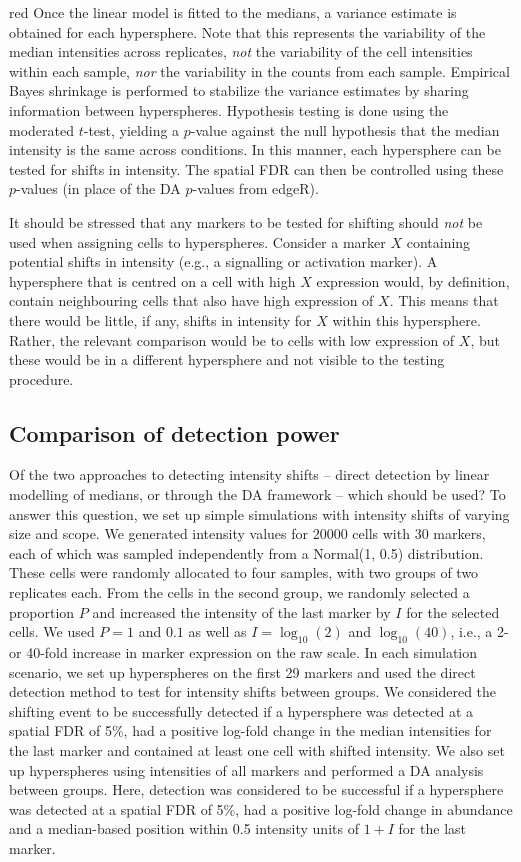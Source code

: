 \documentclass{article}
\begin{document}
\begin{color}{red}
Once the linear model is fitted to the medians, a variance estimate is obtained for each hypersphere.
Note that this represents the variability of the median intensities across replicates, \textit{not} the variability of the cell intensities within each sample, \textit{nor} the variability in the counts from each sample.
Empirical Bayes shrinkage is performed to stabilize the variance estimates by sharing information between hyperspheres.
Hypothesis testing is done using the moderated $t$-test, yielding a $p$-value against the null hypothesis that the median intensity is the same across conditions. 
In this manner, each hypersphere can be tested for shifts in intensity.
The spatial FDR can then be controlled using these $p$-values (in place of the DA $p$-values from edgeR). 

It should be stressed that any markers to be tested for shifting should \textit{not} be used when assigning cells to hyperspheres.
Consider a marker $X$ containing potential shifts in intensity (e.g., a signalling or activation marker).
A hypersphere that is centred on a cell with high $X$ expression would, by definition, contain neighbouring cells that also have high expression of $X$.
This means that there would be little, if any, shifts in intensity for $X$ within this hypersphere.
Rather, the relevant comparison would be to cells with low expression of $X$, but these would be in a different hypersphere and not visible to the testing procedure.

\subsection{Comparison of detection power}
Of the two approaches to detecting intensity shifts -- direct detection by linear modelling of medians, or through the DA framework -- which should be used?
To answer this question, we set up simple simulations with intensity shifts of varying size and scope.
We generated intensity values for 20000 cells with 30 markers, each of which was sampled independently from a Normal(1, 0.5) distribution.
These cells were randomly allocated to four samples, with two groups of two replicates each.
From the cells in the second group, we randomly selected a proportion $P$ and increased the intensity of the last marker by $I$ for the selected cells.
We used $P=1$ and $0.1$ as well as $I=\log_{10}(2)$ and $\log_{10}(40)$, i.e., a 2- or 40-fold increase in marker expression on the raw scale.
In each simulation scenario, we set up hyperspheres on the first 29 markers and used the direct detection method to test for intensity shifts between groups.
We considered the shifting event to be successfully detected if a hypersphere was detected at a spatial FDR of 5\%, had a positive log-fold change in the median intensities for the last marker and contained at least one cell with shifted intensity.
We also set up hyperspheres using intensities of all markers and performed a DA analysis between groups.
Here, detection was considered to be successful if a hypersphere was detected at a spatial FDR of 5\%, had a positive log-fold change in abundance and a median-based position within 0.5 intensity units of $1+I$ for the last marker.


\end{color}
\end{document}
